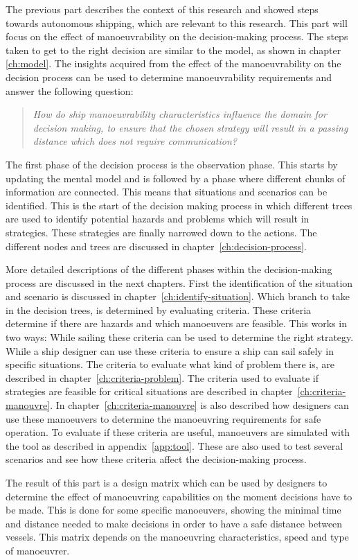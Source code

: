 The previous part describes the context of this research and showed steps towards autonomous shipping, which are relevant to this research. This part will focus on the effect of manoeuvrability on the decision-making process. The steps taken to get to the right decision are similar to the model, as shown in chapter \ref{ch:model}. The insights acquired from the effect of the manoeuvrability on the decision process can be used to determine manoeuvrability requirements and answer the following question:

\begin{quotation}
	\emph{How do ship manoeuvrability characteristics influence the domain for decision making, to ensure that the chosen strategy will result in a passing distance which does not require communication?} 
\end{quotation}

The first phase of the decision process is the observation phase. This starts by updating the mental model and is followed by a phase where different chunks of information are connected. This means that situations and scenarios can be identified. This is the start of the decision making process in which different trees are used to identify potential hazards and problems which will result in strategies. These strategies are finally narrowed down to the actions. The different nodes and trees are discussed in chapter~\ref{ch:decision-process}. 

More detailed descriptions of the different phases within the decision-making process are discussed in the next chapters. First the identification of the situation and scenario is discussed in chapter~\ref{ch:identify-situation}.
Which branch to take in the decision trees, is determined by evaluating criteria. These criteria determine if there are hazards and which manoeuvers are feasible. This works in two ways: While sailing these criteria can be used to determine the right strategy. While a ship designer can use these criteria to ensure a ship can sail safely in specific situations. The criteria to evaluate what kind of problem there is, are described in chapter~\ref{ch:criteria-problem}. The criteria used to evaluate if strategies are feasible for critical situations are described in chapter~\ref{ch:criteria-manouvre}. In chapter~\ref{ch:criteria-manouvre} is also described how designers can use these manoeuvers to determine the manoeuvring requirements for safe operation. To evaluate if these criteria are useful, manoeuvers are simulated with the tool as described in appendix~\ref{app:tool}. These are also used to test several scenarios and see how these criteria affect the decision-making process.

The result of this part is a design matrix which can be used by designers to determine the effect of manoeuvring capabilities on the moment decisions have to be made. This is done for some specific manoeuvers, showing the minimal time and distance needed to make decisions in order to have a safe distance between vessels. This matrix depends on the manoeuvring characteristics, speed and type of manoeuvrer.
